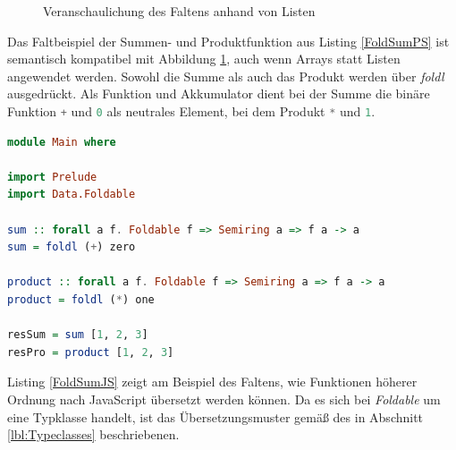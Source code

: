 \documentclass[
12pt,
ngerman,
oneside]
{scrbook} %
\begin{document}
\begin{figure}[ht!]
	\begin{center}
	\end{center}
	\caption{%
		Veranschaulichung des Faltens anhand von Listen \cite{HaskellWikiFold18}
	}%
	\label{fig:RightLeftFold}
\end{figure}

Das Faltbeispiel der Summen- und Produktfunktion aus Listing \ref{FoldSumPS} ist semantisch kompatibel mit Abbildung \ref{fig:RightLeftFold}, auch wenn Arrays statt Listen angewendet werden. Sowohl die Summe als auch das Produkt werden über \emph{foldl} ausgedrückt. Als Funktion und Akkumulator dient bei der Summe die binäre Funktion \lstinline[language=purescript, columns=fixed]{+} und \lstinline[language=purescript, columns=fixed]{0} als neutrales Element, bei dem Produkt \lstinline[language=purescript, columns=fixed]{*} und \lstinline[language=purescript, columns=fixed]{1}. 
\newpage
\begin{lstlisting}[language=purescript, style=numbered-and-boxed, caption=Falten in PureScript, label=FoldSumPS]
module Main where

import Prelude
import Data.Foldable

sum :: forall a f. Foldable f => Semiring a => f a -> a
sum = foldl (+) zero

product :: forall a f. Foldable f => Semiring a => f a -> a
product = foldl (*) one

resSum = sum [1, 2, 3]
resPro = product [1, 2, 3]
\end{lstlisting}

Listing \ref{FoldSumJS} zeigt am Beispiel des Faltens, wie Funktionen höherer Ordnung nach JavaScript übersetzt werden können. Da es sich bei \emph{Foldable} um eine Typklasse handelt, ist das Übersetzungsmuster gemäß des in Abschnitt \glqq \ref{lbl:Typeclasses} \grqq{} beschriebenen.
\end{document}
